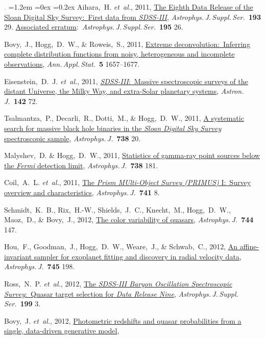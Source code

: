 \documentclass[10pt,letterpaper]{article}
\newcommand{\acronym}[1]{{\small{#1}}}
\newcommand{\foreign}[1]{\textsl{#1}}
\newcommand{\etal}{\foreign{et~al.}}
\newcommand{\project}[1]{\textsl{#1}}
\newcommand{\doi}[2]{\href{http://dx.doi.org/#1}{{#2}}}
\newcommand{\deemph}[1]{\textcolor{grey}{\footnotesize{#1}}}
\newcommand{\pubnumber}[1]{\deemph{{#1}.}}
\newcounter{refpubnum}
\newcommand{\hogglist}{%
    \rightmargin=0in
    \leftmargin=1.2em
    \topsep=0ex
    \partopsep=0pt
    \itemsep=0.2ex
    \parsep=0pt
    \itemindent=-1.0\leftmargin
    \listparindent=0.0\leftmargin
    \settowidth{\labelsep}{~}
    \usecounter{refpubnum}
  }
\begin{document}
\begin{list}{\pubnumber{\therefpubnum}}{\hogglist}
Aihara,~H. \etal, 2011,
\doi{10.1088/0067-0049/193/2/29}{The Eighth Data Release of the Sloan Digital Sky Survey:\ First data from \project{\acronym{SDSS-III}}},
\textit{Astrophys.\,J.\,Suppl.\,Ser.}\ \textbf{193} 29.
\doi{10.1088/0067-0049/195/2/26}{Associated erratum}:\ \textit{Astrophys.\,J.\,Suppl.\,Ser.}\ \textbf{195} 26.
\item
Bovy,~J., Hogg,~D.~W., \& Roweis,~S., 2011,
\doi{10.1214/10-AOAS439}{Extreme deconvolution:\ Inferring complete distribution functions from noisy, heterogeneous and incomplete observations},
\textit{Ann.\,Appl.\,Stat.}\ \textbf{5} 1657--1677.
\item
Eisenstein,~D.~J. \etal, 2011,
\doi{10.1088/0004-6256/142/3/72}{\project{\acronym{SDSS-III}}:\ Massive spectroscopic surveys of the distant Universe, the Milky Way, and extra-Solar planetary systems},
\textit{Astron.\,J.}\ \textbf{142} 72.
\item
Tsalmantza,~P., Decarli,~R., Dotti,~M., \& Hogg,~D.~W., 2011,
\doi{10.1088/0004-637X/738/1/20}{A systematic search for massive black hole binaries in the \project{Sloan Digital Sky Survey} spectroscopic sample},
\textit{Astrophys.\,J.}\ \textbf{738} 20.
\item
Malyshev,~D. \& Hogg,~D.~W., 2011,
\doi{10.1088/0004-637X/738/2/181}{Statistics of gamma-ray point sources below the \project{Fermi} detection limit},
\textit{Astrophys.\,J.}\ \textbf{738} 181.
\item
Coil,~A.~L. \etal, 2011,
\doi{10.1088/0004-637X/741/1/8}{The \project{Prism MUlti-Object Survey (\acronym{PRIMUS})} I:\ Survey overview and characteristics},
\textit{Astrophys.\,J.}\ \textbf{741} 8.
\item
Schmidt,~K.~B., Rix,~H.-W., Shields,~J.~C., Knecht,~M., Hogg,~D.~W., Maoz,~D., \& Bovy,~J., 2012,
\doi{10.1088/0004-637X/744/2/147}{The color variability of quasars}, 
\textit{Astrophys.\,J.}\ \textbf{744} 147.
\item
Hou,~F., Goodman,~J., Hogg,~D.~W., Weare,~J., \& Schwab,~C., 2012,
\doi{10.1088/0004-637X/745/2/198}{An affine-invariant sampler for exoplanet fitting and discovery in radial velocity data},
\textit{Astrophys.\,J.}\ \textbf{745} 198.
\item
Ross,~N.~P. \etal, 2012,
\doi{10.1088/0067-0049/199/1/3}{The \project{\acronym{SDSS-III} Baryon Oscillation Spectroscopic Survey}:\ Quasar target selection for \project{Data Release Nine}},
\textit{Astrophys.\,J.\,Suppl.\,Ser.}\ \textbf{199} 3.
\item
Bovy,~J. \etal, 2012,
\doi{10.1088/0004-637X/749/1/41}{Photometric redshifts and quasar probabilities from a single, data-driven generative model},

\end{list}
\end{document}
